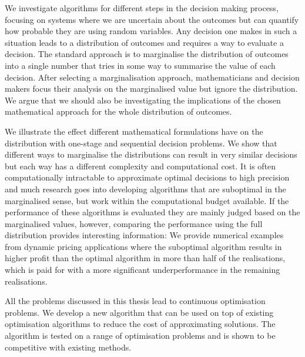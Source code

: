 \documentclass[main.tex]{subfiles}
\begin{document}
We investigate
algorithms for different steps in the decision making process, focusing on
systems where we are uncertain about the outcomes but can quantify how
probable they are using random variables.  Any decision one makes in
such a situation leads to a distribution of outcomes and requires a way
to evaluate a decision.  The standard approach is to
marginalise the distribution of outcomes into a single number that
tries in some way to summarise the value of each decision.  %
After selecting a marginalisation
approach, mathematicians and decision makers
focus their analysis on the marginalised value but ignore the
distribution. We argue that we should also be investigating
the implications of the chosen mathematical approach for the whole
distribution of outcomes.

We illustrate the effect different mathematical
formulations have on the distribution with one-stage and sequential
decision problems. We show that
different ways to marginalise the distributions can result in very similar
decisions but each way has a different complexity and computational
cost. It is often computationally intractable to approximate optimal
decisions to high precision and much research goes into
developing algorithms that are suboptimal in the marginalised sense,
but work within the computational budget available. If the performance
of these algorithms is evaluated they are mainly judged based on the
marginalised values, however, comparing the performance using the full
distribution provides interesting information: We provide numerical
examples from dynamic pricing applications where the suboptimal
algorithm results in higher profit than the optimal algorithm in more
than half of the realisations, which is paid for with a more significant
underperformance in the remaining realisations.

All the problems discussed in this thesis lead to continuous
optimisation problems. We develop a new algorithm that can be used on
top of existing optimisation algorithms to reduce the cost of
approximating solutions. The algorithm is tested on a range of
optimisation problems and is shown to be competitive with existing
methods.
\end{document}
